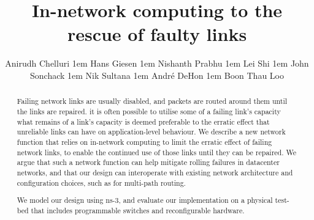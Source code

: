 \documentclass[sigconf]{acmart}
\newcommand{\amdrev}[1]{{\color{blue}{#1}}}
\begin{document}
\title{In-network computing to the rescue of faulty links}

\author{Anirudh Chelluri \kern1em
 Hans Giesen \kern1em
 Nishanth Prabhu \kern1em
 Lei Shi \kern1em
 John Sonchack \kern1em
 Nik Sultana \kern1em
 Andr\'e DeHon \kern1em
 Boon Thau Loo 
}

%
%
%
%


\renewcommand{\shortauthors}{A. Chelluri et al.}

\begin{abstract}
Failing network links are usually disabled, and packets are routed around them
until the links are repaired.  \amdrev{While} %
it is often possible
to utilise some of a failing link's capacity\amdrev{, losing} %
what remains of a link's
capacity is \amdrev{typically} deemed preferable to the erratic effect that unreliable links can
have on application-level behaviour.
We describe a new network function that relies on in-network computing to limit
the erratic effect of failing network links, to enable the continued use of
those links until they can be repaired. We argue that such a network function
can help mitigate rolling failures in datacenter networks, and that our design
can interoperate with existing network architecture and configuration choices,
such as for multi-path routing.

We model our design using ns-3, and evaluate our implementation on a physical
test-bed that includes programmable switches and reconfigurable hardware.
\end{abstract}
\end{document}

